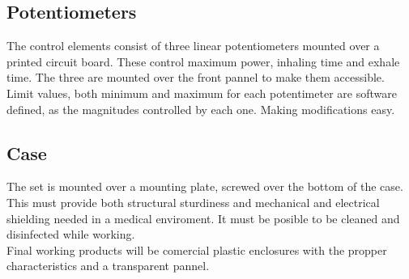 \subsection{Potentiometers}
    The control elements consist of three linear potentiometers mounted over a printed circuit board. These control maximum power, inhaling time and exhale time. The three are mounted over the front pannel to make them accessible.\\
    
    Limit values, both minimum and maximum for each potentimeter are software defined, as the magnitudes controlled by each one. Making modifications easy.

\subsection{Case}
    The set is mounted over a mounting plate, screwed over the bottom of the case. This must provide both structural sturdiness and mechanical and electrical shielding needed in a medical enviroment. It must be posible to be cleaned and disinfected while working.\\ 
    
    Final working products will be comercial plastic enclosures with the propper characteristics and a transparent pannel.
